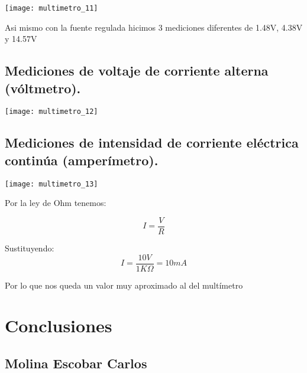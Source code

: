 \documentclass[11pt]{article}
\newenvironment{Figuras}
  {\par\medskip\noindent\minipage{\linewidth}}
  {\endminipage\par\medskip}
\begin{document}
\begin{multicols}{2}
\begin{Figuras}
	\centering
    \texttt{[image: multimetro\_11]}
    \label{fig:mesh10}
\end{Figuras}

Asi mismo con la fuente regulada  hicimos 3 mediciones diferentes de 1.48V, 4.38V y 14.57V

	\subsection{Mediciones de voltaje de corriente alterna (vóltmetro).}

\begin{Figuras}
	\centering
    \texttt{[image: multimetro\_12]}
    \label{fig:mesh11}
\end{Figuras}

	\subsection{Mediciones de intensidad de corriente eléctrica continúa (amperímetro).}

\begin{Figuras}
	\centering
    \texttt{[image: multimetro\_13]}
    \label{fig:mesh12}
\end{Figuras}

Por la ley de Ohm tenemos:

$$I= \frac{V}{R}$$

Sustituyendo:
$$I= \frac{10V}{1K\Omega} = 10mA$$

Por lo que nos queda un valor muy aproximado al del multímetro 

\section{Conclusiones}

\subsection{Molina Escobar Carlos}


\end{multicols}
\end{document}
